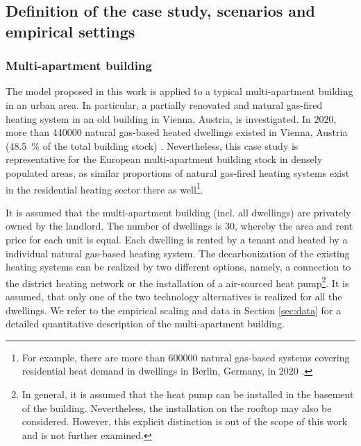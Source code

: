 \subsection{Definition of the case study, scenarios and empirical settings}\label{met:empirical}
\subsubsection{Multi-apartment building}
The model proposed in this work is applied to a typical multi-apartment building in an urban area. In particular, a partially renovated and natural gas-fired heating system in an old building in Vienna, Austria, is investigated. In $2020$, more than \SI{440000}{} natural gas-based heated dwellings existed in Vienna, Austria (\SI{48.5}{\%} of the total building stock) \cite{statistikaustriaheizen}. Nevertheless, this case study is representative for the European multi-apartment building stock in densely populated areas, as similar proportions of natural gas-fired heating systems exist in the residential heating sector there as well\footnote{For example, there are more than \SI{600000}{} natural gas-based systems covering residential heat demand in dwellings in Berlin, Germany, in $2020$ \cite{BDEW2019}.}.\vspace{0.5cm}

It is assumed that the multi-apartment building (incl. all dwellings) are privately owned by the landlord. The number of dwellings is $30$, whereby the area and rent price for each unit is equal. Each dwelling is rented by a tenant and heated by a individual natural gas-based heating system. The decarbonization of the existing heating systems can be realized by two different options, namely, a connection to the district heating network or the installation of a air-sourced heat pump\footnote{In general, it is assumed that the heat pump can be installed in the basement of the building. Nevertheless, the installation on the rooftop may also be considered. However, this explicit distinction is out of the scope of this work and is not further examined.}. It is assumed, that only one of the two technology alternatives is realized for all the dwellings. We refer to the empirical scaling and data in Section \ref{sec:data} for a detailed quantitative description of the multi-apartment building. 

